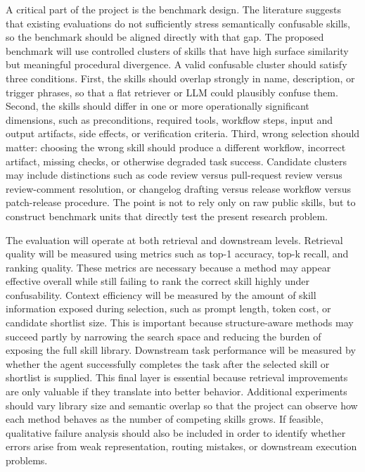 \documentclass[a4paper]{article}
\begin{document}
A critical part of the project is the benchmark design. The literature suggests that existing evaluations do not sufficiently stress semantically confusable skills, so the benchmark should be aligned directly with that gap. The proposed benchmark will use controlled clusters of skills that have high surface similarity but meaningful procedural divergence. A valid confusable cluster should satisfy three conditions. First, the skills should overlap strongly in name, description, or trigger phrases, so that a flat retriever or LLM could plausibly confuse them. Second, the skills should differ in one or more operationally significant dimensions, such as preconditions, required tools, workflow steps, input and output artifacts, side effects, or verification criteria. Third, wrong selection should matter: choosing the wrong skill should produce a different workflow, incorrect artifact, missing checks, or otherwise degraded task success. Candidate clusters may include distinctions such as code review versus pull-request review versus review-comment resolution, or changelog drafting versus release workflow versus patch-release procedure. The point is not to rely only on raw public skills, but to construct benchmark units that directly test the present research problem.

The evaluation will operate at both retrieval and downstream levels. Retrieval quality will be measured using metrics such as top-1 accuracy, top-k recall, and ranking quality. These metrics are necessary because a method may appear effective overall while still failing to rank the correct skill highly under confusability. Context efficiency will be measured by the amount of skill information exposed during selection, such as prompt length, token cost, or candidate shortlist size. This is important because structure-aware methods may succeed partly by narrowing the search space and reducing the burden of exposing the full skill library. Downstream task performance will be measured by whether the agent successfully completes the task after the selected skill or shortlist is supplied. This final layer is essential because retrieval improvements are only valuable if they translate into better behavior. Additional experiments should vary library size and semantic overlap so that the project can observe how each method behaves as the number of competing skills grows. If feasible, qualitative failure analysis should also be included in order to identify whether errors arise from weak representation, routing mistakes, or downstream execution problems.
\end{document}
